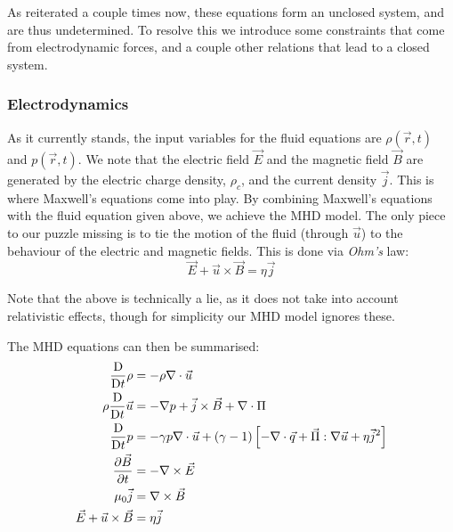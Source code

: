 As reiterated a couple times now, these equations form an unclosed system, and are thus undetermined. 
To resolve this we introduce some constraints that come from electrodynamic forces, and a couple other 
relations that lead to a closed system.

\subsubsection{Electrodynamics}

As it currently stands, the input variables for the fluid equations are $\rho(\vec{r}, t)$ and $p(\vec{r}, t)$. We note that 
the electric field $\vec{E}$ and the magnetic field $\vec{B}$ are generated by the electric charge density, $\rho_c$, and 
the current density $\vec{j}$. This is where Maxwell's equations come into play. By combining Maxwell's equations with the 
fluid equation given above, we achieve the MHD model. The only piece to our puzzle missing is to tie the motion of the fluid 
(through $\vec{u}$) to the behaviour of the electric and magnetic fields. This is done via \textit{Ohm's} law:
\begin{equation}
    \vec{E} + \vec{u} \times \vec{B} = \eta \vec{j}
\end{equation}
\begin{remark}
    Note that the above is technically a lie, as it does not take into account relativistic effects, though for simplicity 
    our MHD model ignores these.
\end{remark}


\begin{definition}
    The MHD equations can then be summarised:
    \begin{align}
        \label{mhd-eq1}
        \frac{\text{D}}{\text{D} t} \rho &= -\rho \nabla \cdot \vec{u} \\
        \rho \frac{\text{D}}{\text{D} t} \vec{u} &= -\nabla p + \vec{j} \times \vec{B} + \nabla \cdot \Pi \\
        \frac{\text{D}}{\text{D} t} p  &= -\gamma p \nabla \cdot \vec{u} + (\gamma - 1) \left [ -\nabla \cdot \vec{q} + \vec{\Pi} : \nabla \vec{u} + \eta \vec{j}^2 \right ] \\
        \pdv{\vec{B}}{t} &= -\nabla \times \vec{E} \\
        \mu_0 \vec{j} &= \nabla \times \vec{B} \\
        \label{mhd-eq-last}
        \vec{E} + \vec{u} \times \vec{B} &= \eta \vec{j}
    \end{align}
\end{definition}

